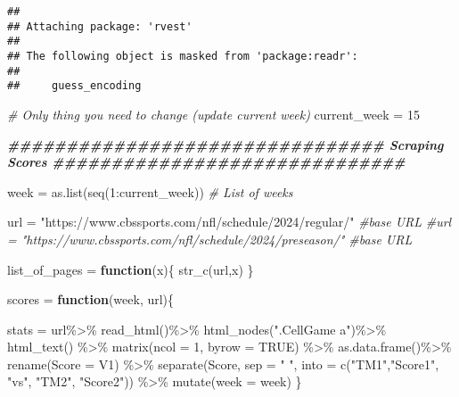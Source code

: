 \documentclass[
]{article}
\newenvironment{Shaded}{\begin{snugshade}}{\end{snugshade}}
\newcommand{\AttributeTok}[1]{\textcolor[rgb]{0.77,0.63,0.00}{#1}}
\newcommand{\CommentTok}[1]{\textcolor[rgb]{0.56,0.35,0.01}{\textit{#1}}}
\newcommand{\ConstantTok}[1]{\textcolor[rgb]{0.00,0.00,0.00}{#1}}
\newcommand{\ControlFlowTok}[1]{\textcolor[rgb]{0.13,0.29,0.53}{\textbf{#1}}}
\newcommand{\DecValTok}[1]{\textcolor[rgb]{0.00,0.00,0.81}{#1}}
\newcommand{\DocumentationTok}[1]{\textcolor[rgb]{0.56,0.35,0.01}{\textbf{\textit{#1}}}}
\newcommand{\FunctionTok}[1]{\textcolor[rgb]{0.00,0.00,0.00}{#1}}
\newcommand{\NormalTok}[1]{#1}
\newcommand{\OtherTok}[1]{\textcolor[rgb]{0.56,0.35,0.01}{#1}}
\newcommand{\SpecialCharTok}[1]{\textcolor[rgb]{0.00,0.00,0.00}{#1}}
\newcommand{\StringTok}[1]{\textcolor[rgb]{0.31,0.60,0.02}{#1}}
\begin{document}
\begin{verbatim}
## 
## Attaching package: 'rvest'
## 
## The following object is masked from 'package:readr':
## 
##     guess_encoding
\end{verbatim}

\begin{Shaded}
\begin{Highlighting}[]
\CommentTok{\# Only thing you need to change (update current week)}
\NormalTok{current\_week }\OtherTok{=} \DecValTok{15}

\DocumentationTok{\#\#\#\#\#\#\#\#\#\#\#\#\#\#\#\#\#\#\#\#\#\#\#\#\#\#\#\#\#\#\#\# Scraping Scores \#\#\#\#\#\#\#\#\#\#\#\#\#\#\#\#\#\#\#\#\#\#\#\#\#\#\#\#\#\#}

\NormalTok{week }\OtherTok{=} \FunctionTok{as.list}\NormalTok{(}\FunctionTok{seq}\NormalTok{(}\DecValTok{1}\SpecialCharTok{:}\NormalTok{current\_week)) }\CommentTok{\# List of weeks}

\NormalTok{url }\OtherTok{=} \StringTok{"https://www.cbssports.com/nfl/schedule/2024/regular/"}  \CommentTok{\#base URL}
\CommentTok{\#url = "https://www.cbssports.com/nfl/schedule/2024/preseason/"  \#base URL}

\NormalTok{list\_of\_pages }\OtherTok{=} \ControlFlowTok{function}\NormalTok{(x)\{}
  \FunctionTok{str\_c}\NormalTok{(url,x)}
\NormalTok{\}}

\NormalTok{scores }\OtherTok{=} \ControlFlowTok{function}\NormalTok{(week, url)\{}
  
\NormalTok{  stats }\OtherTok{=}\NormalTok{ url}\SpecialCharTok{\%\textgreater{}\%}
    \FunctionTok{read\_html}\NormalTok{()}\SpecialCharTok{\%\textgreater{}\%}
    \FunctionTok{html\_nodes}\NormalTok{(}\StringTok{".CellGame a"}\NormalTok{)}\SpecialCharTok{\%\textgreater{}\%}
    \FunctionTok{html\_text}\NormalTok{() }\SpecialCharTok{\%\textgreater{}\%} 
    \FunctionTok{matrix}\NormalTok{(}\AttributeTok{ncol =} \DecValTok{1}\NormalTok{, }\AttributeTok{byrow =} \ConstantTok{TRUE}\NormalTok{) }\SpecialCharTok{\%\textgreater{}\%}
    \FunctionTok{as.data.frame}\NormalTok{()}\SpecialCharTok{\%\textgreater{}\%}
    \FunctionTok{rename}\NormalTok{(}\StringTok{\textasciigrave{}}\AttributeTok{Score}\StringTok{\textasciigrave{}} \OtherTok{=}\NormalTok{ V1) }\SpecialCharTok{\%\textgreater{}\%} 
    \FunctionTok{separate}\NormalTok{(Score, }\AttributeTok{sep =} \StringTok{" "}\NormalTok{, }\AttributeTok{into =} \FunctionTok{c}\NormalTok{(}\StringTok{"TM1"}\NormalTok{,}\StringTok{"Score1"}\NormalTok{, }\StringTok{"vs"}\NormalTok{, }\StringTok{"TM2"}\NormalTok{, }\StringTok{"Score2"}\NormalTok{)) }\SpecialCharTok{\%\textgreater{}\%} 
    \FunctionTok{mutate}\NormalTok{(}\AttributeTok{week =}\NormalTok{ week)}
\NormalTok{\}}


\end{Highlighting}
\end{Shaded}
\end{document}
